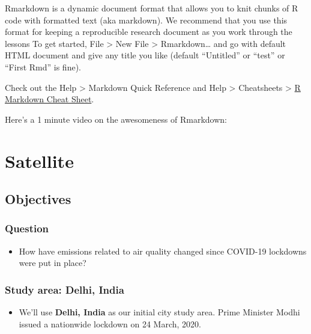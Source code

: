 \documentclass[]{book}
\providecommand{\tightlist}{%
  \setlength{\itemsep}{0pt}\setlength{\parskip}{0pt}}
\begin{document}
Rmarkdown is a dynamic document format that allows you to knit chunks of R code with formatted text (aka markdown). We recommend that you use this format for keeping a reproducible research document as you work through the lessons To get started, File \textgreater{} New File \textgreater{} Rmarkdown\ldots{} and go with default HTML document and give any title you like (default ``Untitled'' or ``test'' or ``First Rmd'' is fine).

Check out the Help \textgreater{} Markdown Quick Reference and Help \textgreater{} Cheatsheets \textgreater{} \href{https://github.com/rstudio/cheatsheets/raw/master/rmarkdown-2.0.pdf}{R Markdown Cheat Sheet}.

Here's a 1 minute video on the awesomeness of Rmarkdown:

\hypertarget{satellite}{%
\chapter{Satellite}\label{satellite}}

\hypertarget{objectives}{%
\section*{Objectives}\label{objectives}}

\hypertarget{question}{%
\subsection*{Question}\label{question}}

\begin{itemize}
\tightlist
\item
  How have emissions related to air quality changed since COVID-19 lockdowns were put in place?
\end{itemize}

\hypertarget{study-area-delhi-india}{%
\subsection*{Study area: Delhi, India}\label{study-area-delhi-india}}

\begin{itemize}
\tightlist
\item
  We'll use \textbf{Delhi, India} as our initial city study area. Prime Minister Modhi issued a nationwide lockdown on 24 March, 2020.
\end{itemize}
\end{document}
